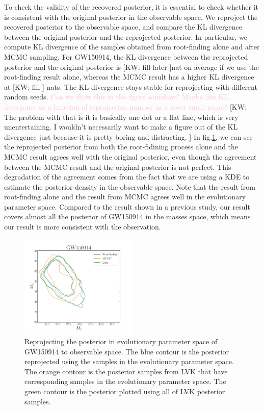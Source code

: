 \documentclass[twocolumn]{aastex631}
\newcommand{\kw}[1]{{\color{rb4}[KW: #1 ]}}
\newcommand{\kb}[1]{\textcolor{pink}{#1}}
\begin{document}
To check the validity of the recovered posterior, it is essential to check whether it is consistent with the original posterior in the observable space.
We reproject the recovered posterior to the observable space, and compare the KL divergence between the original posterior and the reprojected posterior.
In particular, we compute KL divergence of the samples obtained from root-finding alone and after MCMC sampling.
For GW150914, the KL divergence between the reprojected posterior and the original posterior is \kw{fill later}nat on average if we use the root-finding result alone,
whereas the MCMC result has a higher KL divergence at \kw{fill} nats.
The KL divergence stays stable for reprojecting with different random seeds. 
\kb{Can we show this in the figure somehow? Maybe like KL divergence as a function of reprojection number as a lower small panel?}
\kw{The problem with that is it is basically one dot or a flat line, which is very unentertaining. I wouldn't necessarily want to make a figure out of the KL divergence just because it is pretty boring and distracting.}
In fig.\ref{fig:GW150914_reprojection}, we can see the reprojected posterior from both the root-fidining process alone and the MCMC result agrees well with the original posterior,
even though the agreement between the MCMC result and the original posterior is not perfect. 
This degradation of the agreement comes from the fact that we are using a KDE to estimate the posterior density in the observable space.
Note that the result from root-finding alone and the result from MCMC agrees well in the evolutionary parameter space.
Compared to the result shown in a previous study, our result covers almost all the posterior of GW150914 in the masses space,
which means our result is more consistent with the observation.


\begin{figure}
\includegraphics[width=0.49\textwidth]{static/GW150914_reprojection.pdf}
\caption{Reprojecting the posterior in evolutionary parameter space of GW150914 to observable space.
The blue contour is the posterior reprojected using the samples in the evolutionary parameter space.
The orange contour is the posterior samples from LVK that have corresponding samples in the evolutionary parameter space.
The green contour is the posterior plotted using all of LVK posterior samples.
}
\label{fig:GW150914_reprojection}
\end{figure}
\end{document}
